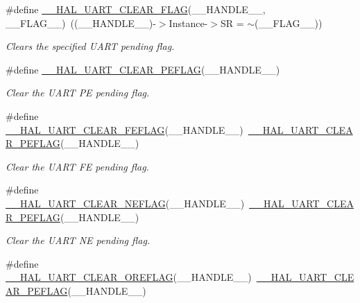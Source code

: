 \begin{DoxyCompactItemize}
\#define \hyperlink{group___u_a_r_t___exported___macros_ga9bd035161d41cde4f2568c7af06493bf}{\+\_\+\+\_\+\+H\+A\+L\+\_\+\+U\+A\+R\+T\+\_\+\+C\+L\+E\+A\+R\+\_\+\+F\+L\+AG}(\+\_\+\+\_\+\+H\+A\+N\+D\+L\+E\+\_\+\+\_\+,  \+\_\+\+\_\+\+F\+L\+A\+G\+\_\+\+\_\+)~((\+\_\+\+\_\+\+H\+A\+N\+D\+L\+E\+\_\+\+\_\+)-\/$>$Instance-\/$>$SR = $\sim$(\+\_\+\+\_\+\+F\+L\+A\+G\+\_\+\+\_\+))
\begin{DoxyCompactList}\small\item\em Clears the specified U\+A\+RT pending flag. \end{DoxyCompactList}\item 
\#define \hyperlink{group___u_a_r_t___exported___macros_gaba5e19c60e0f37341b1585a380b84d49}{\+\_\+\+\_\+\+H\+A\+L\+\_\+\+U\+A\+R\+T\+\_\+\+C\+L\+E\+A\+R\+\_\+\+P\+E\+F\+L\+AG}(\+\_\+\+\_\+\+H\+A\+N\+D\+L\+E\+\_\+\+\_\+)
\begin{DoxyCompactList}\small\item\em Clear the U\+A\+RT PE pending flag. \end{DoxyCompactList}\item 
\#define \hyperlink{group___u_a_r_t___exported___macros_gae1dfc7777b089a10464841045b524caa}{\+\_\+\+\_\+\+H\+A\+L\+\_\+\+U\+A\+R\+T\+\_\+\+C\+L\+E\+A\+R\+\_\+\+F\+E\+F\+L\+AG}(\+\_\+\+\_\+\+H\+A\+N\+D\+L\+E\+\_\+\+\_\+)~\hyperlink{group___u_a_r_t___exported___macros_gaba5e19c60e0f37341b1585a380b84d49}{\+\_\+\+\_\+\+H\+A\+L\+\_\+\+U\+A\+R\+T\+\_\+\+C\+L\+E\+A\+R\+\_\+\+P\+E\+F\+L\+AG}(\+\_\+\+\_\+\+H\+A\+N\+D\+L\+E\+\_\+\+\_\+)
\begin{DoxyCompactList}\small\item\em Clear the U\+A\+RT FE pending flag. \end{DoxyCompactList}\item 
\#define \hyperlink{group___u_a_r_t___exported___macros_gaa1f69421585b3ada4d2b81d502a3ae6b}{\+\_\+\+\_\+\+H\+A\+L\+\_\+\+U\+A\+R\+T\+\_\+\+C\+L\+E\+A\+R\+\_\+\+N\+E\+F\+L\+AG}(\+\_\+\+\_\+\+H\+A\+N\+D\+L\+E\+\_\+\+\_\+)~\hyperlink{group___u_a_r_t___exported___macros_gaba5e19c60e0f37341b1585a380b84d49}{\+\_\+\+\_\+\+H\+A\+L\+\_\+\+U\+A\+R\+T\+\_\+\+C\+L\+E\+A\+R\+\_\+\+P\+E\+F\+L\+AG}(\+\_\+\+\_\+\+H\+A\+N\+D\+L\+E\+\_\+\+\_\+)
\begin{DoxyCompactList}\small\item\em Clear the U\+A\+RT NE pending flag. \end{DoxyCompactList}\item 
\#define \hyperlink{group___u_a_r_t___exported___macros_ga9cdc2f2d55eaaa7895996bf6848df42e}{\+\_\+\+\_\+\+H\+A\+L\+\_\+\+U\+A\+R\+T\+\_\+\+C\+L\+E\+A\+R\+\_\+\+O\+R\+E\+F\+L\+AG}(\+\_\+\+\_\+\+H\+A\+N\+D\+L\+E\+\_\+\+\_\+)~\hyperlink{group___u_a_r_t___exported___macros_gaba5e19c60e0f37341b1585a380b84d49}{\+\_\+\+\_\+\+H\+A\+L\+\_\+\+U\+A\+R\+T\+\_\+\+C\+L\+E\+A\+R\+\_\+\+P\+E\+F\+L\+AG}(\+\_\+\+\_\+\+H\+A\+N\+D\+L\+E\+\_\+\+\_\+)

\end{DoxyCompactItemize}
